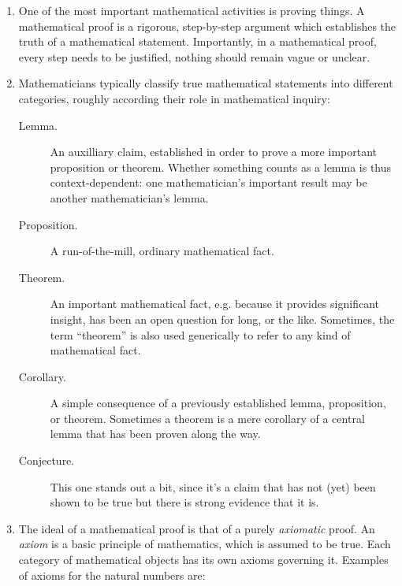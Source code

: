 \begin{enumerate}[{\thesection}.1]
	
	\item One of the most important mathematical activities is proving things. A mathematical proof is a rigorous, step-by-step argument which establishes the truth of a mathematical statement. Importantly, in a mathematical proof, every step needs to be justified, nothing should remain vague or unclear. 
	
		\item Mathematicians typically classify true mathematical statements into  different categories, roughly according their role in mathematical inquiry: 
		
		\begin{description}
							
			\item[Lemma.] An auxilliary claim, established in order to prove a more important proposition or theorem. Whether something counts as a lemma is thus context-dependent: one mathematician's important result may be another mathematician's lemma.
						
			\item[Proposition.] A run-of-the-mill, ordinary mathematical fact.
			
			\item[Theorem.] An important mathematical fact, e.g. because it provides significant insight, has been an open question for long, or the like. Sometimes, the term ``theorem'' is also used generically to refer to any kind of mathematical fact.
			
			\item[Corollary.] A simple consequence of a previously established lemma, proposition, or theorem. Sometimes a theorem is a mere corollary of a central lemma that has been proven along the way. 
			
			\item[Conjecture.] This one stands out a bit, since it's a claim that has not (yet) been shown to be true but there is strong evidence that it is. 
		
		\end{description}
		
	\item The ideal of a mathematical proof is that of a purely \emph{axiomatic} proof. An \emph{axiom} is a basic principle of mathematics, which is assumed to be true. Each category of mathematical objects has its own axioms governing it. Examples of axioms for the natural numbers are: 
	\begin{itemize}
	

\end{itemize}
\end{enumerate}
